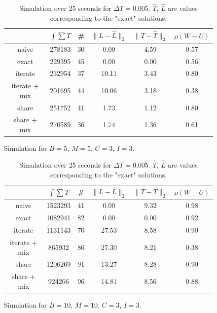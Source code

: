 \documentclass{article}
\begin{document}
\begin{table}[h]
    \centering
    \begin{subfigure}{0.45\linewidth}
    \tiny
    \begin{tabular}{c|c|c|c|c|c}
        & $\int\sum T$ & \#     & $\|L-\hat{L}\|_2$     & $\|T-\hat{T}\|_2$     & $\rho(W-U)$     \\
        \hline
        naive            & 278183     & 30    & 0.00  & 4.59  &  0.57  \\
        exact            & 229395     & 45    & 0.00  & 0.00  &  0.56  \\
        iterate        & 232954     & 37    & 10.11 & 3.43  &  0.80  \\
        iterate + mix  & 201695     & 44    & 10.06 & 3.18  &  0.38  \\
        share            & 251752     & 41    & 1.73  & 1.12  &  0.80  \\
        share + mix      & 270589     & 36    & 1.74  & 1.36  &  0.61  \\
    \end{tabular}
      \caption{Simulation for $B = 5$, $M = 5$, $C = 3$, $I=3$.}
      \label{fig:small}
    \end{subfigure}%
    \hspace{3em}
    \begin{subfigure}{0.45\linewidth}
    \tiny
    \begin{tabular}{c|c|c|c|c|c}
        & $\int\sum T$ & \#     & $\|L-\hat{L}\|_2 $    & $\|T-\hat{T}\|_2 $    & $\rho(W-U)$     \\
        \hline
        naive            & 1523293    & 41    & 0.00  & 9.32  & 0.98  \\
        exact            & 1082941    & 82    & 0.00  & 0.00  & 0.92  \\
        iterate     & 1131143    & 70    & 27.53 & 8.58  & 0.90  \\
        iterate + mix        & 865932     & 86    & 27.30 & 8.21  & 0.38  \\
        share            & 1206269    & 91    & 13.27 & 8.28  & 0.90  \\
        share + mix      & 924266     & 96    & 14.81 & 8.56  & 0.88  \\
    \end{tabular}
      \caption{Simulation for $B = 10$, $M = 10$, $C = 3$, $I=3$.}
      \label{fig:big}
    \end{subfigure}
    \caption{Simulation over 25 seconds for $\Delta T = 0.005$. $\hat{T}$, $\hat{L}$ are values corresponding to the "exact" solutions.}
    \label{tab:eff}
\end{table}
\end{document}
